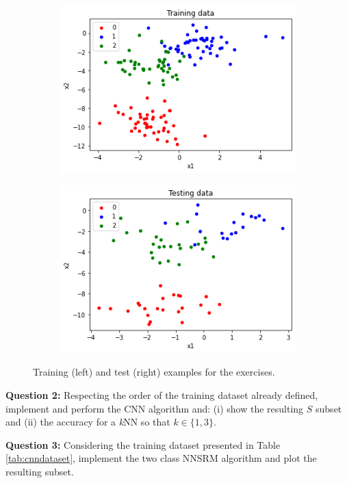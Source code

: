 \begin{figure}
\centering
\begin{subfigure}[b]{0.5\textwidth}
  \centering
  \includegraphics[width=\textwidth]{ "Part 3 - Learning Systems/Supervised Learning/k-Nearest Neighbors/figures/ex1_train.png"}
\end{subfigure}%
\begin{subfigure}[b]{0.5\textwidth}
  \centering
  \includegraphics[width=\textwidth]{ "Part 3 - Learning Systems/Supervised Learning/k-Nearest Neighbors/figures/ex1_test.png"}
\end{subfigure}
\caption{Training (left) and test (right) examples for the exercises.}
\label{fig:ex1datasets}
\end{figure}

\vspace{0.2cm}

\noindent \textbf{Question 2:} Respecting the order of the training dataset already defined, implement and perform the CNN algorithm and: (i) show the resulting $S$ subset and (ii) the accuracy for a \textit{k}NN so that $k \in \{1, 3\}$.

\vspace{0.2cm}

\noindent \textbf{Question 3:} Considering the training dataset presented in Table \ref{tab:cnndataset}, implement the two class NNSRM algorithm and plot the resulting subset.



